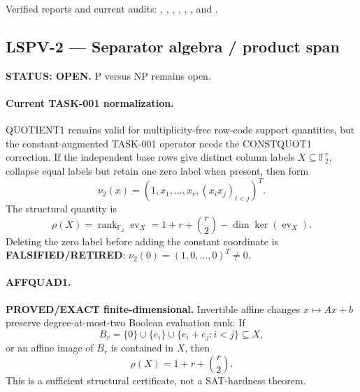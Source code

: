 \documentclass[11pt]{article}
\begin{document}
Verified reports and current audits:
,
,
,
,
,
, and
.

\subsection{LSPV-2 --- Separator algebra / product span}
\textbf{STATUS: OPEN.} P versus NP remains open.

\paragraph{Current TASK-001 normalization.}
QUOTIENT1 remains valid for multiplicity-free row-code support quantities, but the constant-augmented TASK-001 operator needs the CONSTQUOT1 correction.  If the independent base rows give distinct column labels \(X\subseteq\mathbb F_2^r\), collapse equal labels but retain one zero label when present, then form
\[
 \nu_2(x)=\left(1,x_1,\ldots,x_r,(x_ix_j)_{i<j}\right)^T.
\]
The structural quantity is
\[
 \rho(X)=\operatorname{rank}_{\mathbb F_2}\operatorname{ev}_X
 =1+r+\binom r2-\dim\ker(\operatorname{ev}_X).
\]
Deleting the zero label before adding the constant coordinate is \textbf{FALSIFIED/RETIRED}: \(\nu_2(0)=(1,0,\ldots,0)^T\neq0\).

\paragraph{AFFQUAD1.}
\textbf{PROVED/EXACT finite-dimensional.}  Invertible affine changes \(x\mapsto Ax+b\) preserve degree-at-most-two Boolean evaluation rank.  If
\[
 B_r=\{0\}\cup\{e_i\}\cup\{e_i+e_j:i<j\}\subseteq X,
\]
or an affine image of \(B_r\) is contained in \(X\), then
\[
 \rho(X)=1+r+\binom r2.
\]
This is a sufficient structural certificate, not a SAT-hardness theorem.
\end{document}
